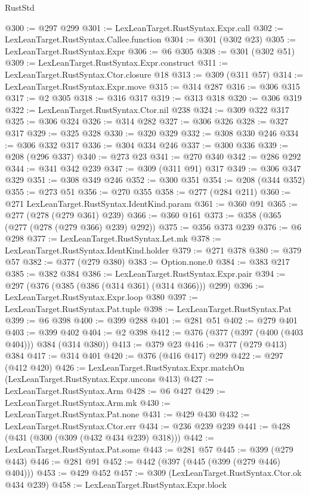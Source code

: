 \begin{lexlean}{RustStd}
\begin{coremodule}
@300 := @297 @299
@301 := LexLeanTarget.RustSyntax.Expr.call
@302 := LexLeanTarget.RustSyntax.Callee.function
@304 := @301 (@302 @23)
@305 := LexLeanTarget.RustSyntax.Expr
@306 := @6 @305
@308 := @301 (@302 @51)
@309 := LexLeanTarget.RustSyntax.Expr.construct
@311 := LexLeanTarget.RustSyntax.Ctor.closure @18
@313 := @309 (@311 @57)
@314 := LexLeanTarget.RustSyntax.Expr.move
@315 := @314 @287
@316 := @306 @315
@317 := @2 @305
@318 := @316 @317
@319 := @313 @318
@320 := @306 @319
@322 := LexLeanTarget.RustSyntax.Ctor.nil @238
@324 := @309 @322 @317
@325 := @306 @324
@326 := @314 @282
@327 := @306 @326
@328 := @327 @317
@329 := @325 @328
@330 := @320 @329
@332 := @308 @330 @246
@334 := @306 @332 @317
@336 := @304 @334 @246
@337 := @300 @336
@339 := @208 (@296 @337)
@340 := @273 @23
@341 := @270 @340
@342 := @286 @292
@344 := @341 @342 @239
@347 := @309 (@311 @91) @317
@349 := @306 @347 @329
@351 := @308 @349 @246
@352 := @300 @351
@354 := @208 (@344 @352)
@355 := @273 @51
@356 := @270 @355
@358 := @277 (@284 @211)
@360 := @271 LexLeanTarget.RustSyntax.IdentKind.param
@361 := @360 @91
@365 := @277 (@278 (@279 @361) @239)
@366 := @360 @161
@373 := @358 (@365 (@277 (@278 (@279 @366) @239) @292))
@375 := @356 @373 @239
@376 := @6 @298
@377 := LexLeanTarget.RustSyntax.Let.mk
@378 := LexLeanTarget.RustSyntax.IdentKind.holder
@379 := @271 @378
@380 := @379 @57
@382 := @377 (@279 @380)
@383 := Option.none.{0}
@384 := @383 @217
@385 := @382 @384
@386 := LexLeanTarget.RustSyntax.Expr.pair
@394 := @297 (@376 (@385 (@386 (@314 @361) (@314 @366))) @299)
@396 := LexLeanTarget.RustSyntax.Expr.loop @380
@397 := LexLeanTarget.RustSyntax.Pat.tuple
@398 := LexLeanTarget.RustSyntax.Pat
@399 := @6 @398
@400 := @399 @288
@401 := @281 @51
@402 := @279 @401
@403 := @399 @402
@404 := @2 @398
@412 := @376 (@377 (@397 (@400 (@403 @404))) @384 (@314 @380))
@413 := @379 @23
@416 := @377 (@279 @413) @384
@417 := @314 @401
@420 := @376 (@416 @417) @299
@422 := @297 (@412 @420)
@426 := LexLeanTarget.RustSyntax.Expr.matchOn (LexLeanTarget.RustSyntax.Expr.uncons @413)
@427 := LexLeanTarget.RustSyntax.Arm
@428 := @6 @427
@429 := LexLeanTarget.RustSyntax.Arm.mk
@430 := LexLeanTarget.RustSyntax.Pat.none
@431 := @429 @430
@432 := LexLeanTarget.RustSyntax.Ctor.err
@434 := @236 @239 @239
@441 := @428 (@431 (@300 (@309 (@432 @434 @239) @318)))
@442 := LexLeanTarget.RustSyntax.Pat.some
@443 := @281 @57
@445 := @399 (@279 @443)
@446 := @281 @91
@452 := @442 (@397 (@445 (@399 (@279 @446) @404)))
@453 := @429 @452
@457 := @309 (LexLeanTarget.RustSyntax.Ctor.ok @434 @239)
@458 := LexLeanTarget.RustSyntax.Expr.block

\end{coremodule}
\end{lexlean}
